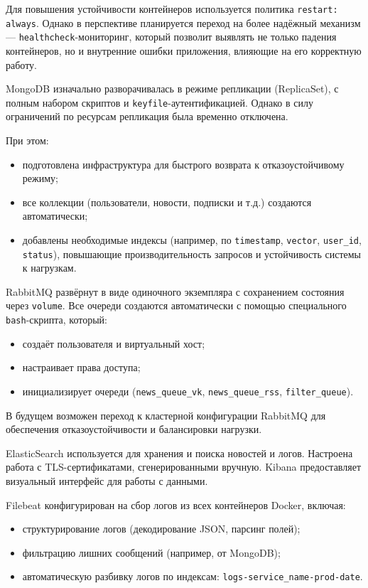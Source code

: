 Для повышения устойчивости контейнеров используется политика \texttt{restart: always}.
Однако в перспективе планируется переход на более надёжный механизм — \texttt{healthcheck}-мониторинг, который позволит выявлять не только падения контейнеров, но и внутренние ошибки приложения, влияющие на его корректную работу.

MongoDB изначально разворачивалась в режиме репликации (ReplicaSet), с полным набором скриптов и \texttt{keyfile}-аутентификацией.
Однако в силу ограничений по ресурсам репликация была временно отключена.

При этом:
\begin{itemize}
  \item подготовлена инфраструктура для быстрого возврата к отказоустойчивому режиму;
  \item все коллекции (пользователи, новости, подписки и т.д.) создаются автоматически;
  \item добавлены необходимые индексы (например, по \texttt{timestamp}, \texttt{vector}, \texttt{user\_id}, \texttt{status}), повышающие производительность запросов и устойчивость системы к нагрузкам.
\end{itemize}

RabbitMQ развёрнут в виде одиночного экземпляра с сохранением состояния через \texttt{volume}.
Все очереди создаются автоматически с помощью специального \texttt{bash}-скрипта, который:
\begin{itemize}
  \item создаёт пользователя и виртуальный хост;
  \item настраивает права доступа;
  \item инициализирует очереди (\texttt{news\_queue\_vk}, \texttt{news\_queue\_rss}, \texttt{filter\_queue}).
\end{itemize}

В будущем возможен переход к кластерной конфигурации RabbitMQ для обеспечения отказоустойчивости и балансировки нагрузки.

ElasticSearch используется для хранения и поиска новостей и логов.
Настроена работа с TLS-сертификатами, сгенерированными вручную.
Kibana предоставляет визуальный интерфейс для работы с данными.

Filebeat конфигурирован на сбор логов из всех контейнеров Docker, включая:
\begin{itemize}
  \item структурирование логов (декодирование JSON, парсинг полей);
  \item фильтрацию лишних сообщений (например, от MongoDB);
  \item автоматическую разбивку логов по индексам: \texttt{logs-{service\_name}-prod-{date}}.
\end{itemize}

